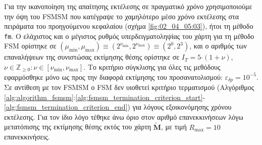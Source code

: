 Για την ικανοποίηση της απαίτησης εκτέλεσης σε πραγματικό χρόνο χρησιμοποιούμε
την όψη του FSMSM που κατέγραψε το χαμηλότερο μέσο χρόνο εκτέλεσης στα
πειράματα του προηγούμενου κεφαλαίου (σχήμα \ref{fig:02_04_05:03}), ήτοι τη
μέθοδο \texttt{fm}.  Ο ελάχιστος και ο μέγιστος ρυθμός υπερδειγματοληψίας του
χάρτη για τη μέθοδο FSM ορίστηκε σε $(\mu_{\min},\mu_{\max}) \equiv
(2^{\nu_{\min}},2^{\nu_{\max}}) \equiv (2^0,2^3)$, και ο αριθμός των
επαναλήψεων της συνιστώσας εκτίμησης θέσης ορίστηκε σε $I_T=5$$\cdot$$(1+\nu)$,
$\nu \in \mathbb{Z}_{\geq 0}: \nu \in [\nu_{\min}, \nu_{\max}]$. Το κριτήριο
σύγκλισης για όλες τις μεθόδους εφαρμόσθηκε μόνο ως προς την διαφορά εκτίμησης
του προσανατολισμού: $\varepsilon_{\delta p} = 10^{-5}$. Σε αντίθεση με τον
FSMSM ο FSM δεν υιοθετεί κριτήριο τερματισμού (Αλγόριθμος
\ref{alg:algorithm_fsmsm}:\ref{alg:fsmsm_termination_criterion_start}-\ref{alg:fsmsm_termination_criterion_end})
για λόγους εξοικονόμησης χρόνου εκτέλεσης. Για τον ίδιο λόγο τέθηκε άνω όριο
στον αριθμό επανεκκινήσεων λόγω μετατόπισης της εκτίμησης θέσης εκτός του χάρτη
$\widetilde{\bm{M}}$, με τιμή $R_{\max} = 10$ επανεκκινήσεις.

